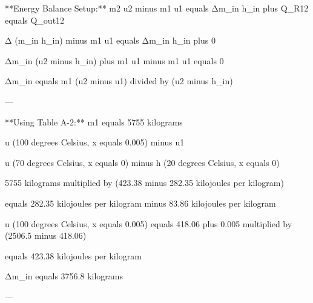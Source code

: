**Energy Balance Setup:**  
m2 u2 minus m1 u1 equals Δm_in h_in plus Q_R12 equals Q_out12  

Δ (m_in h_in) minus m1 u1 equals Δm_in h_in plus 0  

Δm_in (u2 minus h_in) plus m1 u1 minus m1 u1 equals 0  

Δm_in equals m1 (u2 minus u1) divided by (u2 minus h_in)  

---

**Using Table A-2:**  
m1 equals 5755 kilograms  

u (100 degrees Celsius, x equals 0.005) minus u1  

u (70 degrees Celsius, x equals 0) minus h (20 degrees Celsius, x equals 0)  

5755 kilograms multiplied by (423.38 minus 282.35 kilojoules per kilogram)  

equals 282.35 kilojoules per kilogram minus 83.86 kilojoules per kilogram  

u (100 degrees Celsius, x equals 0.005) equals 418.06 plus 0.005 multiplied by (2506.5 minus 418.06)  

equals 423.38 kilojoules per kilogram  

Δm_in equals 3756.8 kilograms  

---